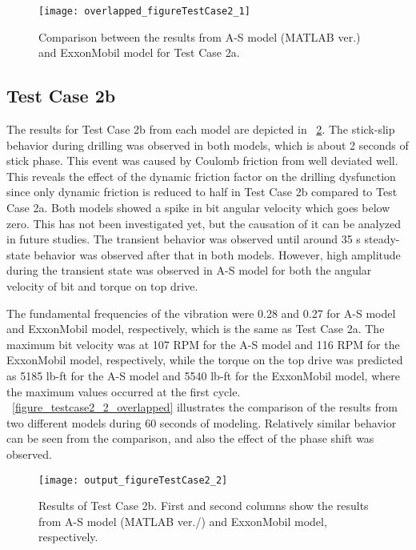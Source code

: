 \begin{figure}
  \centering
  \texttt{[image: overlapped\_figureTestCase2\_1]}
  \caption[Comparison of the results for Test Case 2a]{Comparison between the results from A-S model (MATLAB ver.) and ExxonMobil model for Test Case 2a.}\label{figure_testcase2_1_overlapped}
\end{figure}


\subsection{Test Case 2b}
The results for Test Case 2b from each model are depicted in \figurename~\ref{figure_testcase2_2}. The stick-slip behavior during drilling was observed in both models, which is about 2 seconds of stick phase. This event was caused by Coulomb friction from well deviated well. This reveals the effect of the dynamic friction factor on the drilling dysfunction since only dynamic friction is reduced to half in Test Case 2b compared to Test Case 2a. Both models showed a spike in bit angular velocity which goes below zero. This has not been investigated yet, but the causation of it can be analyzed in future studies. The transient behavior was observed until around 35 s steady-state behavior was observed after that in both models. However, high amplitude during the transient state was observed in A-S model for both the angular velocity of bit and torque on top drive. 

The fundamental frequencies of the vibration were 0.28 and 0.27 for A-S model and ExxonMobil model, respectively, which is the same as Test Case 2a. The maximum bit velocity was at 107 RPM for the A-S model and 116 RPM for the ExxonMobil model, respectively, while the torque on the top drive was predicted as 5185 lb-ft for the A-S model and 5540 lb-ft for the ExxonMobil model, where the maximum values occurred at the first cycle. \figurename~\ref{figure_testcase2_2_overlapped} illustrates the comparison of the results from two different models during 60 seconds of modeling. Relatively similar behavior can be seen from the comparison, and also the effect of the phase shift was observed.

\begin{figure}
  \centering
  \texttt{[image: output\_figureTestCase2\_2]}
  \caption[Results of Test Case 2b]{Results of Test Case 2b. First and second columns show the results from A-S model (MATLAB ver./) and ExxonMobil model, respectively.}\label{figure_testcase2_2}
\end{figure}

